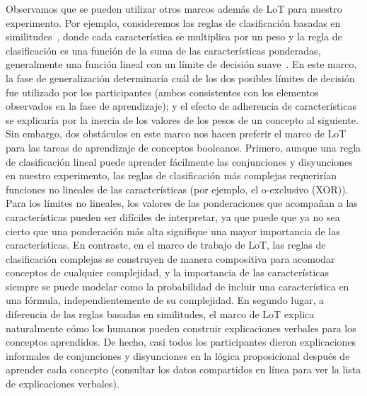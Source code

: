 Observamos que se pueden utilizar otros marcos además de LoT para nuestro experimento. Por ejemplo, consideremos las reglas de clasificación basadas en similitudes~\cite{juslin2003cue, juslin2003exemplar}, donde cada característica se multiplica por un peso y la regla de clasificación es una función de la suma de las características ponderadas, generalmente una función lineal con un límite de decisión suave~\cite{juslin2003exemplar}. En este marco, la fase de generalización determinaría cuál de los dos posibles límites de decisión fue utilizado por los participantes (ambos consistentes con los elementos observados en la fase de aprendizaje); y el efecto de adherencia de características se explicaría por la inercia de los valores de los pesos de un concepto al siguiente. Sin embargo, dos obstáculos en este marco nos hacen preferir el marco de LoT para las tareas de aprendizaje de conceptos booleanos. Primero, aunque una regla de clasificación lineal puede aprender fácilmente las conjunciones y disyunciones en nuestro experimento, las reglas de clasificación más complejas requerirían funciones no lineales de las características (por ejemplo, el o-exclusivo (XOR)). Para los límites no lineales, los valores de las ponderaciones que acompañan a las características pueden ser difíciles de interpretar, ya que puede que ya no sea cierto que una ponderación más alta signifique una mayor importancia de las características. En contraste, en el marco de trabajo de LoT, las reglas de clasificación complejas se construyen de manera compositiva para acomodar conceptos de cualquier complejidad, y la importancia de las características siempre se puede modelar como la probabilidad de incluir una característica en una fórmula, independientemente de su complejidad. En segundo lugar, a diferencia de las reglas basadas en similitudes, el marco de LoT explica naturalmente cómo los humanos pueden construir explicaciones verbales para los conceptos aprendidos. De hecho, casi todos los participantes dieron explicaciones informales de conjunciones y disyunciones en la lógica proposicional después de aprender cada concepto (consultar los datos compartidos en línea para ver la lista de explicaciones verbales).


